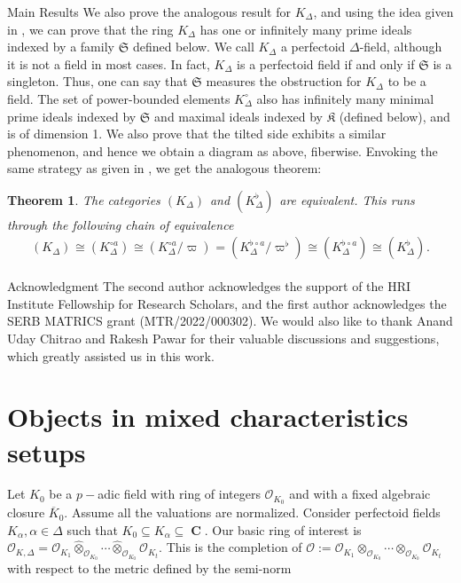 \documentclass[12pts,a4paper]{amsart}
\newtheorem{theorem}[proposition]{Theorem}
\DeclareMathOperator{\fet}{f\acute{e}t}
\DeclareMathOperator{\C}{\textbf{C}}
\begin{document}
\begin{subsection}{Main Results}
We also prove the analogous result for $K_\Delta$, and using the idea given in \cite{Jac}, we can prove that the ring $K_\Delta$ has one or infinitely many prime ideals indexed by a family $\mathfrak{S}$ defined below. We call $K_\Delta$ a perfectoid $\Delta$-field, although it is not a field in most cases. In fact, $K_\Delta$ is a perfectoid field if and only if $\mathfrak{S}$ is a singleton. Thus, one can say that $\mathfrak{S}$ measures the obstruction for $K_\Delta$ to be a field. The set of power-bounded elements $K^\circ_\Delta$ also has infinitely many minimal prime ideals indexed by $\mathfrak{S}$ and maximal ideals indexed by $\mathfrak{K}$ (defined below), and is of dimension 1. We also prove that the tilted side exhibits a similar phenomenon, and hence we obtain a diagram as above, fiberwise. Envoking the same strategy as given in \cite{Sch}, we get the analogous theorem:
\begin{theorem}
    The categories $(K_\Delta)_{\fet}$ and $(K^{\flat}_{\Delta})_{\fet}$ are equivalent. This runs through the following chain of equivalence
    \begin{align*}
        (K_\Delta)_{\fet}\cong (K^{\circ a}_\Delta)_{\fet}\cong (K^{\circ a}_\Delta/\varpi)_{\fet}= (K^{\flat\circ a}_\Delta/{\varpi^\flat})_{\fet}\cong (K^{\flat\circ a}_\Delta)_{\fet}\cong (K^\flat_\Delta)_{\fet}.
    \end{align*}
\end{theorem}

\end{subsection}


\begin{subsection}{Acknowledgment}
The second author acknowledges the support of the HRI Institute Fellowship for Research Scholars, and the first author acknowledges the SERB MATRICS grant (MTR/2022/000302). We would also like to thank Anand Uday Chitrao and Rakesh Pawar for their valuable discussions and suggestions, which greatly assisted us in this work.
\end{subsection}


\section{Objects in mixed characteristics setups}\label{section1}

Let $K_0$ be a $p-$adic field with ring of integers $\mathcal{O}_{K_0}$ and with a fixed algebraic closure $\overline{K}_0$. Assume all the valuations are normalized. Consider perfectoid fields $K_\alpha, \alpha\in\Delta$ such that $K_0\subseteq K_\alpha\subseteq \C$. Our basic ring of interest is $\mathcal{O}_{K,\Delta}=\mathcal{O}_{K_1}\hat{\otimes}_{\mathcal{O}_{K_0}}\cdots\hat{\otimes}_{\mathcal{O}_{K_0}}\mathcal{O}_{K_t}$. This is the completion of $\mathcal{O}:=\mathcal{O}_{K_1}\otimes_{\mathcal{O}_{K_0}}\cdots\otimes_{\mathcal{O}_{K_0}}\mathcal{O}_{K_t}$ with respect to the metric defined by the semi-norm
\end{document}
